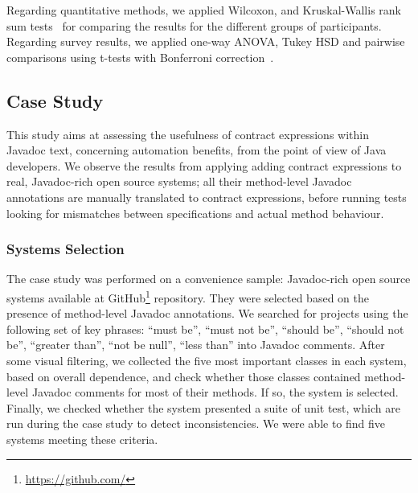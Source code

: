 Regarding quantitative methods, we applied Wilcoxon, and Kruskal-Wallis rank sum tests~\cite{statistical} for comparing the results for the different groups of participants. Regarding survey results, we applied one-way ANOVA, Tukey HSD and pairwise comparisons using t-tests with Bonferroni correction~\cite{statistical}.%

\subsection{Case Study}
\label{sec:caseStudy}
This study aims at assessing the usefulness of contract expressions within Javadoc text, concerning automation benefits, from the point of view of Java developers. 
We observe the results from applying adding contract expressions to \totalSystems{} real, Javadoc-rich open source systems; all their method-level Javadoc annotations are manually translated to contract expressions, before running tests looking for mismatches between specifications and actual method behaviour.

\subsubsection{Systems Selection} 
\label{sec:systems}

The case study was performed on a convenience sample: \totalSystems{} Javadoc-rich open source systems available at GitHub\footnote{\url{https://github.com/}} repository.
They were selected based on the presence of method-level Javadoc annotations. 
We searched for projects using the following set of key phrases: ``must be'', ``must not be'', ``should
be'', ``should not be'', ``greater than'', ``not be null'', ``less than'' into Javadoc
comments.
After some visual filtering, we collected the five most important classes in
each system, based on overall dependence, and check whether those classes
contained method-level Javadoc comments for most of their methods. If so, the
system is selected. Finally, we checked whether the system presented a suite of
unit test, which are run during the case study to detect inconsistencies. We
were able to find five systems meeting these criteria.

